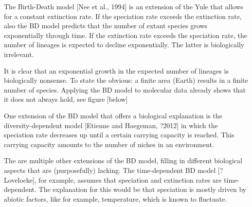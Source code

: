 %

The Birth-Death model [Nee et al., 1994] is an extension of the
Yule that allows for a constant extinction rate. 
If the speciation rate exceeds the extinction rate,
also the BD model predicts that the number of extant species
grows exponentially through time. If the extinction rate exceeds
the speciation rate, the number of lineages is expected to decline
exponentially. The latter is biologically irrelevant.

%

It is clear that an exponential growth in the expected number of lineages
is biologically nonsense. 
To state the obvious: a finite area (Earth) results in a finite number of species. 
Applying the BD model to molecular data already shows that it does not
always hold, see figure [below]

%
%
%
%
%

One extension of the BD model that offers a biological explanation is the
diversity-dependent model [Etienne and Haegeman, ?2012] in which the
speciation rate decreases up until a certain carrying capacity is reached.
This carrying capacity amounts to the number of niches in an environment.

%
%
%
%
%

The are multiple other extensions of the BD model, filling in different
biological aspects that are (purposefully) lacking. The time-dependent BD 
model [?Lovelocke], for example, assumes that speciation and extinction 
rates are time-dependent. The explanation for this would be that speciation
is mostly driven by abiotic factors, like for example, temperature,
which is known to fluctuate.


